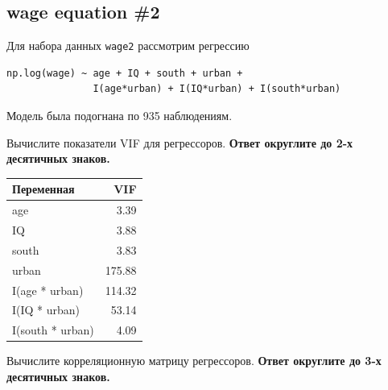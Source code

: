 \documentclass[
  russian,
]{article}
\newcounter{none} %
\begin{document}
\subsection{wage equation \#2}\label{wage-equation-2}

Для набора данных \texttt{wage2} рассмотрим регрессию

\begin{verbatim}
np.log(wage) ~ age + IQ + south + urban +
               I(age*urban) + I(IQ*urban) + I(south*urban)
\end{verbatim}

Модель была подогнана по 935 наблюдениям.

Вычислите показатели VIF для регрессоров. \textbf{Ответ округлите до 2-х
десятичных знаков.}

{\def\LTcaptype{none} %
\begin{longtable}[]{@{}lr@{}}
\toprule\noalign{}
Переменная & VIF \\
\midrule\noalign{}
\endhead
\bottomrule\noalign{}
\endlastfoot
age & 3.39 \\
IQ & 3.88 \\
south & 3.83 \\
urban & 175.88 \\
I(age * urban) & 114.32 \\
I(IQ * urban) & 53.14 \\
I(south * urban) & 4.09 \\
\end{longtable}
}

Вычислите корреляционную матрицу регрессоров. \textbf{Ответ округлите до
3-х десятичных знаков.}
\end{document}
